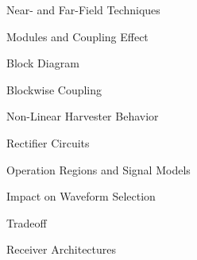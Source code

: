 \begin{section}{}
	\begin{subsection}{Near- and Far-Field Techniques}

	\end{subsection}

	\begin{subsection}{Modules and Coupling Effect}
		\begin{subsubsection}{Block Diagram}

		\end{subsubsection}

		\begin{subsubsection}{Blockwise Coupling}

		\end{subsubsection}
	\end{subsection}

	\begin{subsection}{Non-Linear Harvester Behavior}
		\begin{subsubsection}{Rectifier Circuits}

		\end{subsubsection}

		\begin{subsubsection}{Operation Regions and Signal Models}

		\end{subsubsection}

		\begin{subsubsection}{Impact on Waveform Selection}

		\end{subsubsection}
	\end{subsection}
\end{section}

\begin{section}{}
	\begin{subsection}{ Tradeoff}

	\end{subsection}

	\begin{subsection}{Receiver Architectures}

	\end{subsection}
\end{section}

\begin{section}{}
	\begin{subsection}{}

	\end{subsection}

	\begin{subsection}{}

	\end{subsection}

	\begin{subsection}{}

	\end{subsection}

	\begin{subsection}{}

	\end{subsection}
\end{section}

